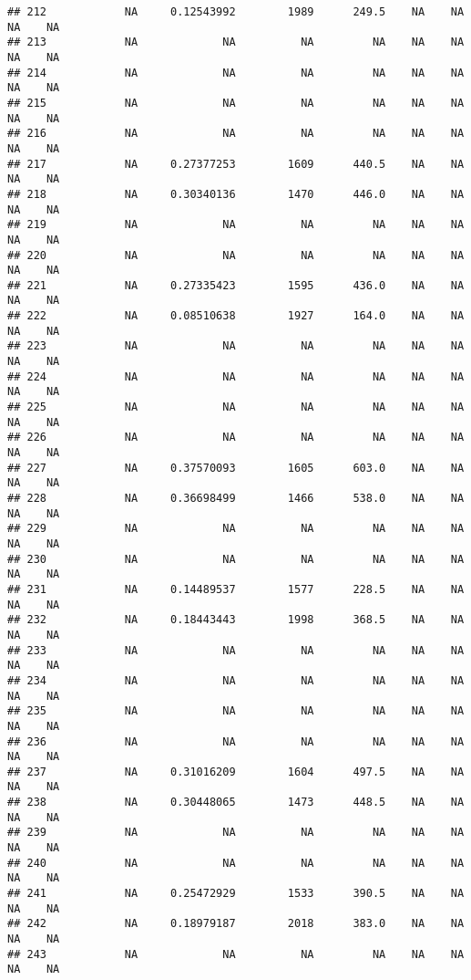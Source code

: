 \documentclass[]{article}
\begin{document}
\begin{verbatim}
## 212            NA     0.12543992        1989      249.5    NA    NA    NA    NA
## 213            NA             NA          NA         NA    NA    NA    NA    NA
## 214            NA             NA          NA         NA    NA    NA    NA    NA
## 215            NA             NA          NA         NA    NA    NA    NA    NA
## 216            NA             NA          NA         NA    NA    NA    NA    NA
## 217            NA     0.27377253        1609      440.5    NA    NA    NA    NA
## 218            NA     0.30340136        1470      446.0    NA    NA    NA    NA
## 219            NA             NA          NA         NA    NA    NA    NA    NA
## 220            NA             NA          NA         NA    NA    NA    NA    NA
## 221            NA     0.27335423        1595      436.0    NA    NA    NA    NA
## 222            NA     0.08510638        1927      164.0    NA    NA    NA    NA
## 223            NA             NA          NA         NA    NA    NA    NA    NA
## 224            NA             NA          NA         NA    NA    NA    NA    NA
## 225            NA             NA          NA         NA    NA    NA    NA    NA
## 226            NA             NA          NA         NA    NA    NA    NA    NA
## 227            NA     0.37570093        1605      603.0    NA    NA    NA    NA
## 228            NA     0.36698499        1466      538.0    NA    NA    NA    NA
## 229            NA             NA          NA         NA    NA    NA    NA    NA
## 230            NA             NA          NA         NA    NA    NA    NA    NA
## 231            NA     0.14489537        1577      228.5    NA    NA    NA    NA
## 232            NA     0.18443443        1998      368.5    NA    NA    NA    NA
## 233            NA             NA          NA         NA    NA    NA    NA    NA
## 234            NA             NA          NA         NA    NA    NA    NA    NA
## 235            NA             NA          NA         NA    NA    NA    NA    NA
## 236            NA             NA          NA         NA    NA    NA    NA    NA
## 237            NA     0.31016209        1604      497.5    NA    NA    NA    NA
## 238            NA     0.30448065        1473      448.5    NA    NA    NA    NA
## 239            NA             NA          NA         NA    NA    NA    NA    NA
## 240            NA             NA          NA         NA    NA    NA    NA    NA
## 241            NA     0.25472929        1533      390.5    NA    NA    NA    NA
## 242            NA     0.18979187        2018      383.0    NA    NA    NA    NA
## 243            NA             NA          NA         NA    NA    NA    NA    NA

\end{verbatim}
\end{document}
